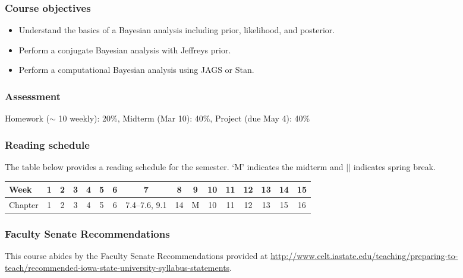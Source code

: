 \documentclass[12pt]{article}
\begin{document}
\subsubsection*{Course objectives}
\begin{itemize}
\item Understand the basics of a Bayesian analysis including prior, likelihood, and posterior. 
\item Perform a conjugate Bayesian analysis with Jeffreys prior.
\item Perform a computational Bayesian analysis using JAGS or Stan.
\end{itemize}

\subsubsection*{Assessment}

Homework ($\sim$ 10 weekly): 20\%, Midterm (Mar 10): 40\%, Project (due May 4): 40\%

\subsubsection*{Reading schedule}

The table below provides a reading schedule for the semester. `M' indicates the midterm and $\vert\vert$ indicates spring break. 

\vspace{0.2in} 

\begin{tabular}{|l|ccccccccc||cccccc|}
\hline
Week & 1 & 2 & 3 & 4 & 5 & 6 & 7 & 8 & 9 & 10 & 11 & 12 & 13 & 14 & 15 \\
\hline
Chapter & 1 & 2  & 3 & 4 & 5 & 6 & 7.4--7.6, 9.1 & 14 & M & 10 & 11 & 12 & 13 & 15 & 16\\
\hline
\end{tabular}

\subsubsection*{Faculty Senate Recommendations}

This course abides by the Faculty Senate Recommendations provided at \url{http://www.celt.iastate.edu/teaching/preparing-to-teach/recommended-iowa-state-university-syllabus-statements}.
\end{document}
